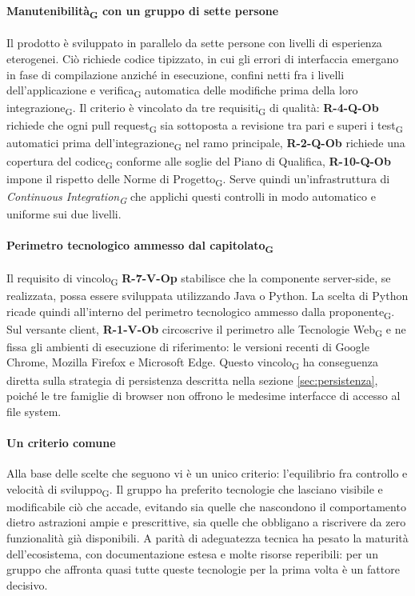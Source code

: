 \documentclass[a4paper, 10pt]{article}
\begin{document}
\paragraph{Manutenibilità\textsubscript{G} con un gruppo di sette persone}
Il prodotto è sviluppato in parallelo da sette persone con livelli di esperienza eterogenei. Ciò richiede codice tipizzato, in cui gli errori di interfaccia emergano in fase di compilazione anziché in esecuzione, confini netti fra i livelli dell'applicazione e verifica\textsubscript{G} automatica delle modifiche prima della loro integrazione\textsubscript{G}. Il criterio è vincolato da tre requisiti\textsubscript{G} di qualità: \textbf{R-4-Q-Ob} richiede che ogni pull request\textsubscript{G} sia sottoposta a revisione tra pari e superi i test\textsubscript{G} automatici prima dell'integrazione\textsubscript{G} nel ramo principale, \textbf{R-2-Q-Ob} richiede una copertura del codice\textsubscript{G} conforme alle soglie del Piano di Qualifica, \textbf{R-10-Q-Ob} impone il rispetto delle Norme di Progetto\textsubscript{G}. Serve quindi un'infrastruttura di \textit{Continuous Integration\textsubscript{G}} che applichi questi controlli in modo automatico e uniforme sui due livelli.

\paragraph{Perimetro tecnologico ammesso dal capitolato\textsubscript{G}}
Il requisito di vincolo\textsubscript{G} \textbf{R-7-V-Op} stabilisce che la componente server-side, se realizzata, possa essere sviluppata utilizzando Java o Python. La scelta di Python ricade quindi all'interno del perimetro tecnologico ammesso dalla proponente\textsubscript{G}. Sul versante client, \textbf{R-1-V-Ob} circoscrive il perimetro alle Tecnologie Web\textsubscript{G} e ne fissa gli ambienti di esecuzione di riferimento: le versioni recenti di Google Chrome, Mozilla Firefox e Microsoft Edge. Questo vincolo\textsubscript{G} ha conseguenza diretta sulla strategia di persistenza descritta nella sezione \ref{sec:persistenza}, poiché le tre famiglie di browser non offrono le medesime interfacce di accesso al file system.

\paragraph{Un criterio comune}
Alla base delle scelte che seguono vi è un unico criterio: l'equilibrio fra controllo e velocità di sviluppo\textsubscript{G}. Il gruppo ha preferito tecnologie che lasciano visibile e modificabile ciò che accade, evitando sia quelle che nascondono il comportamento dietro astrazioni ampie e prescrittive, sia quelle che obbligano a riscrivere da zero funzionalità già disponibili. A parità di adeguatezza tecnica ha pesato la maturità dell'ecosistema, con documentazione estesa e molte risorse reperibili: per un gruppo che affronta quasi tutte queste tecnologie per la prima volta è un fattore decisivo.
\end{document}
